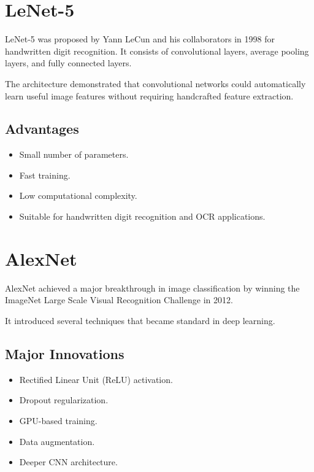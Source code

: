 \documentclass[12pt,a4paper]{article}
\begin{document}

\section{LeNet-5}

LeNet-5 was proposed by Yann LeCun and his collaborators in 1998 for handwritten digit recognition. It consists of convolutional layers, average pooling layers, and fully connected layers.

The architecture demonstrated that convolutional networks could automatically learn useful image features without requiring handcrafted feature extraction.

\subsection{Advantages}

\begin{itemize}
    \item Small number of parameters.
    \item Fast training.
    \item Low computational complexity.
    \item Suitable for handwritten digit recognition and OCR applications.
\end{itemize}


\section{AlexNet}

AlexNet achieved a major breakthrough in image classification by winning the ImageNet Large Scale Visual Recognition Challenge in 2012.

It introduced several techniques that became standard in deep learning.

\subsection{Major Innovations}

\begin{itemize}
    \item Rectified Linear Unit (ReLU) activation.
    \item Dropout regularization.
    \item GPU-based training.
    \item Data augmentation.
    \item Deeper CNN architecture.
\end{itemize}
\end{document}

